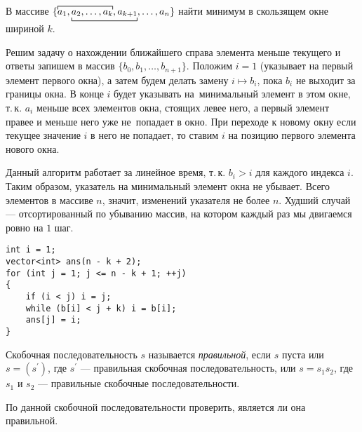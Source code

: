 \begin{problem}
    В массиве $\{\rlap{$\overbracket[.2mm]{\phantom{a_1, a_2, \ldots, a_k}}$}a_1, \underbracket[.2mm]{a_2, \ldots, a_k, a_{k + 1}}, \ldots, a_n\}$ найти минимум в скользящем окне шириной $k$.
\end{problem}

Решим задачу о нахождении ближайшего справа элемента меньше \mbox{текущего} и ответы запишем в массив $\{b_0, b_1, \ldots, b_{n + 1}\}$. Положим \mbox{$i = 1$} (указывает на первый элемент первого окна), а затем будем делать \mbox{замену} $i \mapsto b_i$, пока $b_i$ не выходит за границы окна. В конце $i$ будет указывать на~минимальный элемент в этом окне, т.\,к. $a_i$ меньше всех \mbox{элементов} \mbox{окна}, стоящих левее него, а первый элемент правее и \mbox{меньше} него уже не~\mbox{попадает} в окно. При переходе к новому окну если текущее значение $i$ в него не попадает, то ставим $i$ на позицию первого элемента нового окна.

Данный алгоритм работает за линейное время, т.\,к. $b_i > i$ для каждого индекса $i$. Таким образом, указатель на минимальный элемент окна не убывает. Всего элементов в массиве $n$, значит, изменений указателя не более $n$. Худший случай --- отсортированный по убыванию массив, на котором каждый раз мы двигаемся ровно на $1$ шаг.

\begin{verbatim}
int i = 1;
vector<int> ans(n - k + 2);
for (int j = 1; j <= n - k + 1; ++j)
{
    if (i < j) i = j;
    while (b[i] < j + k) i = b[i];
    ans[j] = i;
}
\end{verbatim}

\begin{definition}
    Скобочная последовательность $s$ называется \textit{правильной}, если $s$ пуста или $s = (s^\prime)$, где $s^\prime$ --- правильная скобочная последовательность, или $s = s_1s_2$, где $s_1$ и $s_2$ --- правильные скобочные последовательности.
\end{definition}

\begin{problem}
    По данной скобочной последовательности проверить, является ли она правильной.
\end{problem}


